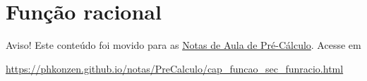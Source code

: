 




\section{Função racional}\label{cap_funcao_sec_funracio}

\begin{center}
  Aviso! Este conteúdo foi movido para as \href{https://phkonzen.github.io/notas/PreCalculo/main.html}{Notas de Aula de Pré-Cálculo}. Acesse em

  \url{https://phkonzen.github.io/notas/PreCalculo/cap_funcao_sec_funracio.html}
\end{center}



